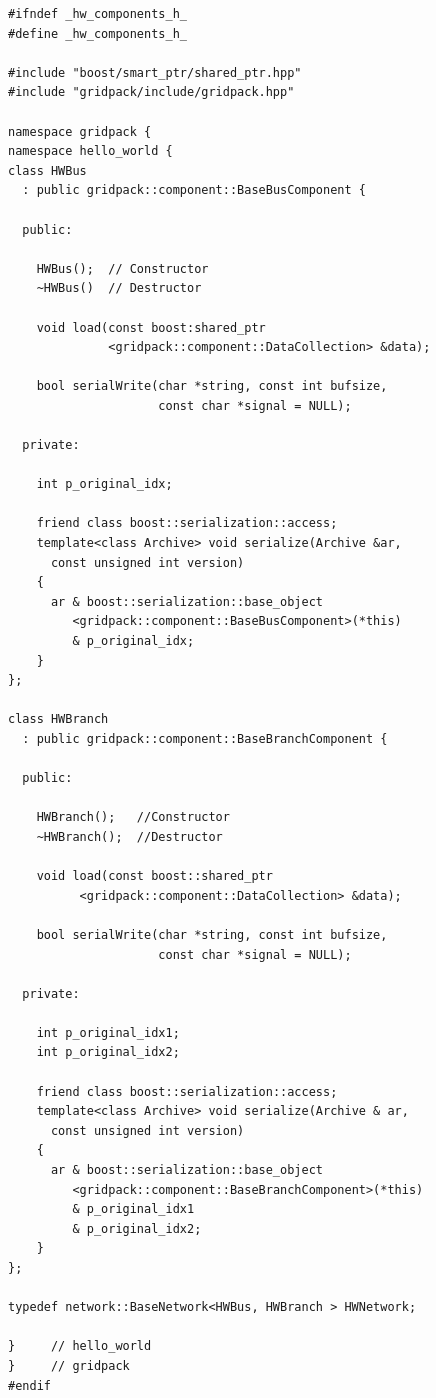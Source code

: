 \documentclass[12pt]{report} %
\begin{document}
{
\color{red}
\begin{Verbatim}[fontseries=b]
#ifndef _hw_components_h_
#define _hw_components_h_

#include "boost/smart_ptr/shared_ptr.hpp"
#include "gridpack/include/gridpack.hpp"

namespace gridpack {
namespace hello_world {
class HWBus
  : public gridpack::component::BaseBusComponent {

  public:

    HWBus();  // Constructor
    ~HWBus()  // Destructor

    void load(const boost:shared_ptr
              <gridpack::component::DataCollection> &data);

    bool serialWrite(char *string, const int bufsize,
                     const char *signal = NULL);

  private:

    int p_original_idx;

    friend class boost::serialization::access;
    template<class Archive> void serialize(Archive &ar,
      const unsigned int version)
    {
      ar & boost::serialization::base_object
         <gridpack::component::BaseBusComponent>(*this)
         & p_original_idx;
    }
};

class HWBranch
  : public gridpack::component::BaseBranchComponent {

  public:

    HWBranch();   //Constructor
    ~HWBranch();  //Destructor

    void load(const boost::shared_ptr
          <gridpack::component::DataCollection> &data);

    bool serialWrite(char *string, const int bufsize,
                     const char *signal = NULL);

  private:

    int p_original_idx1;
    int p_original_idx2;

    friend class boost::serialization::access;
    template<class Archive> void serialize(Archive & ar,
      const unsigned int version)
    {
      ar & boost::serialization::base_object
         <gridpack::component::BaseBranchComponent>(*this)
         & p_original_idx1
         & p_original_idx2;
    }
};

typedef network::BaseNetwork<HWBus, HWBranch > HWNetwork;

}     // hello_world
}     // gridpack
#endif
\end{Verbatim}
}
\end{document}
